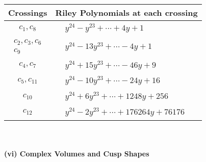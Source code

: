 \documentclass[1p]{elsarticle_modified}
\theoremstyle{definition}
\begin{document}
\begin{tabular}{m{50pt}|m{274pt}}
Crossings & \hspace{64pt}Riley Polynomials at each crossing \\
\hline $$\begin{aligned}c_{1},c_{8}\end{aligned}$$&$\begin{aligned}
&y^{24}- y^{23}+\cdots+4 y+1
\end{aligned}$\\
\hline $$\begin{aligned}c_{2},c_{3},c_{6}\\c_{9}\end{aligned}$$&$\begin{aligned}
&y^{24}-13 y^{23}+\cdots-4 y+1
\end{aligned}$\\
\hline $$\begin{aligned}c_{4},c_{7}\end{aligned}$$&$\begin{aligned}
&y^{24}+15 y^{23}+\cdots-46 y+9
\end{aligned}$\\
\hline $$\begin{aligned}c_{5},c_{11}\end{aligned}$$&$\begin{aligned}
&y^{24}-10 y^{23}+\cdots-24 y+16
\end{aligned}$\\
\hline $$\begin{aligned}c_{10}\end{aligned}$$&$\begin{aligned}
&y^{24}+6 y^{23}+\cdots+1248 y+256
\end{aligned}$\\
\hline $$\begin{aligned}c_{12}\end{aligned}$$&$\begin{aligned}
&y^{24}-2 y^{23}+\cdots+176264 y+76176
\end{aligned}$\\
\hline
\end{tabular}\\~\\
\newpage\flushleft \textbf{(vi) Complex Volumes and Cusp Shapes}
\end{document}
